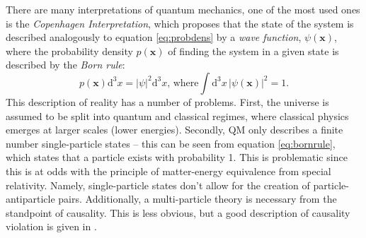 There are many interpretations of quantum mechanics, one of the most used ones is the \textit{Copenhagen Interpretation}, which proposes that the state of the system is described analogously to equation \ref{eq:probdens} by a \textit{wave function}, $\psi(\mathbf{x})$, where the probability density $p(\mathbf{x})$ of finding the system in a given state is described by the \textit{Born rule}:
\begin{equation}\label{eq:bornrule}
    p(\mathbf{x})\mathrm{d}^3x=|\psi|^2\mathrm{d}^3x,\hspace{2pt}\text{where} \int\mathrm{d}^3x\hspace{2pt}|\psi(\mathbf{x})|^2=1.
\end{equation}
This description of reality has a number of problems. First, the universe is assumed to be split into quantum and classical regimes, where classical physics emerges at larger scales (lower energies). Secondly, QM only describes a finite number single-particle states -- this can be seen from equation \ref{eq:bornrule}, which states that a particle exists with probability 1. This is problematic since this is at odds with the principle of matter-energy equivalence from special relativity. Namely, single-particle states don't allow for the creation of particle-antiparticle pairs. Additionally, a multi-particle theory is necessary from the standpoint of causality. This is less obvious, but a good description of causality violation is given in \cite{Theory:PeskinSchroeder}.

